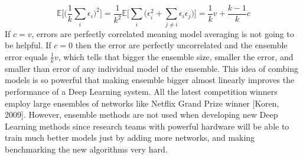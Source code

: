 \documentclass[paper=a4, fontsize=11pt]{scrartcl}
\numberwithin{equation}{section}		%
\numberwithin{figure}{section}			%
\numberwithin{table}{section}			%
\begin{document}
	$$
	\mathbb E\bigg[\bigg(\frac{1}{k}\sum_i \epsilon_i\bigg)^2\bigg] = \frac{1}{k^2}\mathbb E\bigg[  \sum_i\bigg( \epsilon_i^2 + \sum_{j \not = i} \epsilon_i\epsilon_j \bigg) \bigg] = \frac{1}{k}v + \frac{k-1}{k}c
	$$
	If $c = v $, errors are perfectly correlated meaning model averaging is not going to be helpful. If $c=0$
	then the error are perfectly uncorrelated and the ensemble error equals $\frac{1}{k}v$, which tells that bigger the ensemble size, smaller the error, and smaller than error of any individual model of the ensemble.
	This idea of combing models is so powerful that making ensemble bigger almost linearly improves the performance of a Deep Learning system. All the latest competition winners employ large ensembles of networks like Netflix Grand Prize winner [Koren, 2009]. However, ensemble methods are not used when developing new Deep Learning methods since research teams with powerful hardware will be able to train much better models just by adding more networks, and making benchmarking the new algorithms very hard.
\end{document}
